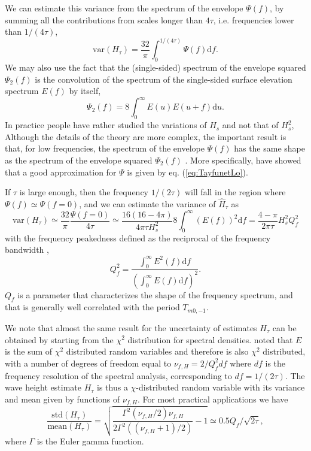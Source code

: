 {We can estimate this variance from the spectrum of the envelope $\Psi (f)$, by summing all the contributions from scales longer than $4 \tau$, i.e. frequencies lower than $1/(4 \tau)$, 
\begin{equation}
   \mathrm{var}(H_\tau) = \frac{32}{\pi} \int_0^{1/(4 \tau)} \Psi (f) {\mathrm d} f.
   \label{eq:relation_Hs_eta}
\end{equation}
We may also use the fact that the (single-sided) spectrum of the envelope squared  $\Psi_2(f)$ is the convolution of the spectrum of the single-sided
surface elevation spectrum $E(f)$ by itself,
\begin{equation}
    \Psi_{2}(f) = 8 \int_0^\infty E(u)E(u+f)\mathrm{d}u. 
\label{eq:psi2_1sided}
\end{equation}
 In practice people have rather studied the variations of $H_s$ and not that of $H_s^2$, 
 Although the details of the theory are more complex, the important result is that, for low frequencies, the spectrum of the envelope $\Psi(f)$ has the same shape as the spectrum of the envelope squared $\Psi_2(f)$ \citep{Rice1944}. More specifically, \cite{Tayfun&Lo1989} have showed that a good approximation for $\Psi$ is given by eq. (\ref{eq:TayfunetLo}). 

If $\tau$ is large enough, then the frequency $1/(2 \tau)$ will fall in the region where $\Psi(f) \simeq \Psi(f=0)$, and we can estimate the  variance of $\widehat{H}_\tau$ as
\begin{equation}
   \mathrm{var}(H_\tau)\simeq \frac{32}{\pi} \frac{\Psi (f=0)}{4 \tau} \simeq \frac{16(16 - 4 \pi) }{4 \pi \tau H_s^2} 8 \int_0^\infty (E(f))^2 {\mathrm d}f =  \frac{4 -  \pi }{ 2 \pi  \tau }  H_s^2 Q_f^2 
   \label{eq:groups_var_1D}
\end{equation}
with the frequency peakedness defined as the reciprocal of the frequency bandwidth \citep{Saulnier&al.2012}, 
\begin{equation} 
   Q_f^2 = \frac{  \int_{0}^\infty E^2(f)\mathrm{d}f}{\left(\int_{0}^\infty E(f)\mathrm{d}f\right)^2}. \label{eq:Qf}
\end{equation}
$Q_f$ is a parameter that characterizes the shape of the frequency spectrum, and that is generally well correlated with the period $T_{m0,-1}$. 

We note that almost the same result for the uncertainty of estimates $H_\tau$ can be obtained by starting from the $\chi^2$ distribution for 
spectral densities. \cite{Young1986} noted that $E$ is the sum of $\chi^2$ distributed random variables and therefore is also $\chi^2$ distributed, with a number of degrees of freedom equal to $\nu_{f,H}=2/ Q_f^2 df$ where $df$ is the frequency resolution of the spectral analysis, corresponding to $df=1/(2 \tau)$. The wave height estimate $H_\tau$ is thus a $\chi$-distributed random variable with its variance and mean given by  functions of $\nu_{f,H}$. 
For most practical applications we have 
\begin{equation}
\frac{\mathrm{std}(H_\tau)}{\mathrm{mean}(H_\tau)} =\sqrt{\frac{\Gamma^2(\nu_{f,H}/2) \nu_{f,H}}{2 \Gamma^2((\nu_{f,H}+1)/2)}-1} \simeq 0.5  Q_f / \sqrt{ 2 \tau },
   \label{eq:groups_var_1DY}
\end{equation}
where $\Gamma$ is the Euler gamma function. 

}
